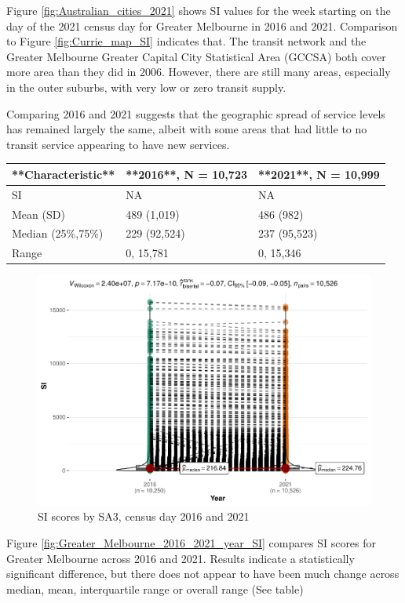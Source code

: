 \documentclass[preprint, 3p,
authoryear]{elsarticle} %
\begin{document}
Figure \ref{fig:Australian_cities_2021} shows SI values for the week
starting on the day of the 2021 census day for Greater Melbourne in 2016
and 2021. Comparison to Figure \ref{fig:Currie_map_SI} indicates that.
The transit network and the Greater Melbourne Greater Capital City
Statistical Area (GCCSA) both cover more area than they did in 2006.
However, there are still many areas, especially in the outer suburbs,
with very low or zero transit supply.

Comparing 2016 and 2021 suggests that the geographic spread of service
levels has remained largely the same, albeit with some areas that had
little to no transit service appearing to have new services.

\begin{tabular}{l|l|l}
\hline
**Characteristic** & **2016**, N = 10,723 & **2021**, N = 10,999\\
\hline
SI & NA & NA\\
\hline
Mean (SD) & 489 (1,019) & 486 (982)\\
\hline
Median (25\%,75\%) & 229 (92,524) & 237 (95,523)\\
\hline
Range & 0, 15,781 & 0, 15,346\\
\hline
\end{tabular}

\begin{figure}
\centering
\includegraphics{Leveraging_GTFS_to_assess_transit_supply_Transport_Geography_files/figure-latex/Greater_Melbourne_2016_2021_year_SI-1.pdf}
\caption{SI scores by SA3, census day 2016 and 2021}
\end{figure}

Figure \ref{fig:Greater_Melbourne_2016_2021_year_SI} compares SI scores
for Greater Melbourne across 2016 and 2021. Results indicate a
statistically significant difference, but there does not appear to have
been much change across median, mean, interquartile range or overall
range (See table)
\end{document}
